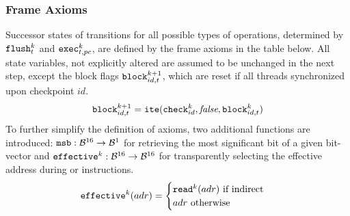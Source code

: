 

\subsubsection*{Frame Axioms}

\newcommand{\TRUE}{\textit{true}}
\newcommand{\FALSE}{\textit{false}}

\newcommand{\EFFECTIVE}{\texttt{effective}}
\newcommand{\MSB}{\texttt{msb}}

Successor states of transitions for all possible types of operations, determined by $\texttt{flush}^k_t$ and $\texttt{exec}^k_{t, pc}$, are defined by the frame axioms in the table below.
All state variables, not explicitly altered are assumed to be unchanged in the next step, except the block flags $\texttt{block}^{k + 1}_{id, t}$, which are reset if all threads synchronized upon checkpoint $id$.
\[
  \BLOCK^{k + 1}_{id, t} = \ITE(\CHECK^k_{id}, \FALSE, \BLOCK^k_{id, t})
\]
To further simplify the definition of axioms, two additional functions are introduced:
$\MSB: \BVSORT \to \BVSORT[1]$ for retrieving the most significant bit of a given bit-vector and $\EFFECTIVE^k: \BVSORT \to \BVSORT$ for transparently selecting the effective address during  or  instructions.
\vspace{-0.1cm}
\[
  \EFFECTIVE^k(adr) =
  \begin{cases}
    \READ^k(adr) \text{ if indirect} \\
    adr \text{ otherwise}
  \end{cases}
\]


